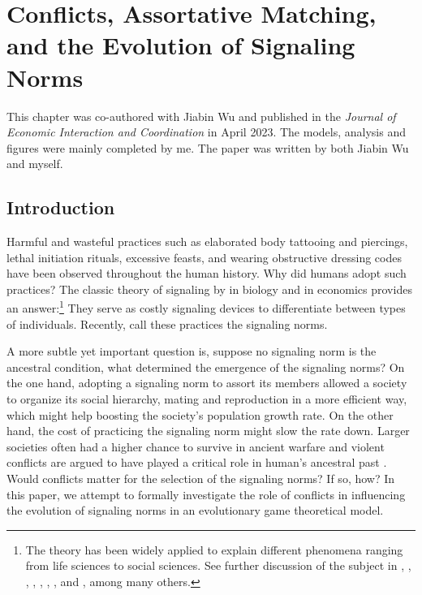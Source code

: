 \chapter{Conflicts, Assortative Matching, and the Evolution of Signaling Norms}

This chapter was co-authored with Jiabin Wu and published in the \textit{Journal of Economic Interaction and Coordination} in April 2023. The models, analysis and figures were mainly completed by me. The paper was written by both Jiabin Wu and myself. 

\section{Introduction}
Harmful and wasteful practices such as elaborated body tattooing and piercings, lethal initiation rituals, excessive feasts, and wearing obstructive dressing codes have been observed throughout the human history. Why did humans adopt such practices? The classic theory of signaling by \cite{Zahavi1975} in biology and \cite{Spence1973} in economics provides an answer:\footnote{The theory has been widely applied to explain different phenomena ranging from life sciences to social sciences. See further discussion of the subject in \cite{Grafen1990}, \cite{MaynardSmithHarper1995}, \cite{Johnstone1997},  \cite{ZahaviZahavi1997}, \cite{MaynardSmithHarper2003}, \cite{SearcyNowicki2005}, \cite{Getty2006}, \cite{Grose2011} and \cite{Szamado2012}, among many others.} They serve as costly signaling devices to differentiate between types of individuals. Recently, \cite{PrzepiorkaDiekmann2021} call these practices the signaling norms. 

A more subtle yet important question is, suppose no signaling norm is the ancestral condition, what determined the emergence of the signaling norms? On the one hand, adopting a signaling norm to assort its members allowed a society to organize its social hierarchy, mating and reproduction in a more efficient way, which might help boosting the society's population growth rate. On the other hand, the cost of practicing the signaling norm might slow the rate down. Larger societies often had a higher chance to survive in ancient warfare and violent conflicts are argued to have played a critical role in human's ancestral past \citep{Keeley1996, WranghamPeterson1996,  BussShackelford1997, LeBlancRegister2003, GuilaineXammit2004, Gat2006, PottsHayden2008, Ferguson2012}. Would conflicts matter for the selection of the signaling norms? If so, how? In this paper, we attempt to formally investigate the role of conflicts in influencing the evolution of signaling norms in an evolutionary game theoretical model. 


